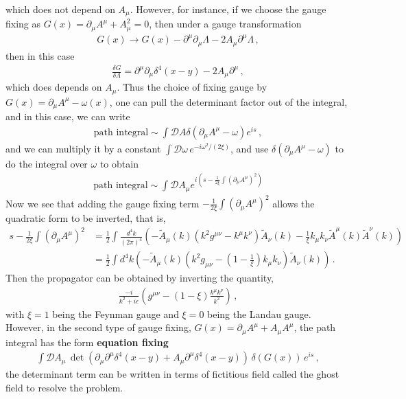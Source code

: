 \documentclass[11pt, onesided]{book}
\theoremstyle{break}
\theoremstyle{break}
\newcommand{\pd}{\partial}
\newcommand{\that}[1]{\widetilde{#1}}
\begin{document}
which does not depend on $A_\mu$. However, for instance, if we choose the gauge fixing as $G(x) = \pd_\mu A^\mu + A_\mu^2 = 0$, then under a gauge transformation
\begin{align*}
G(x) \to G(x) - \pd^\mu \pd_\mu \Lambda - 2 A_\mu \pd^\mu \Lambda\,,
\end{align*}
then in this case
\begin{align*}
\frac{\delta G}{\delta \Lambda}= \pd^\mu \pd_\mu \delta^4(x-y) - 2A_\mu \pd^\mu\,,
\end{align*}
which does depends on $A_\mu$. Thus the choice of fixing gauge by $G(x) = \pd_\mu A^\mu - \omega(x)$, one can pull the determinant factor out of the integral, and in this case, we can write
\begin{align*}
\text{path integral} \sim \int \mathcal{D}A \delta(\pd_\mu A^\mu -\omega) e^{is}\,,
\end{align*}
and we can multiply it by a constant $\int \mathcal{D}\omega \, e^{-i\omega^2 /(2\xi)}$, and use $\delta(\pd_\mu A^\mu - \omega)$ to do the integral over $\omega$ to obtain
\begin{align*}
\text{path integral} \sim \int \mathcal{D}A_\mu e^{i\left( s - \frac{1}{2\xi}\int (\pd_\mu A^\mu)^2\right)}
\end{align*}
Now we see that adding the gauge fixing term $- \frac{1}{2\xi}\int (\pd_\mu A^\mu)^2$ allows the quadratic form to be inverted, that is,
\begin{align*}
s- \frac{1}{2\xi}\int (\pd_\mu A^\mu)^2 
&= \frac{1}{2}\int \frac{d^4 k}{(2\pi)^4}
\left( -\that{A}_\mu (k) \left( k^2 g^{\mu\nu} - k^\mu k^\nu \right) \that{A}_\nu(k) - \frac{1}{\xi} k_\mu k_\nu \that{A}^\mu(k) \that{A}^\nu (k)\right)\\
&= \frac{1}{2}\int d^4k \left( - \that{A}_\mu (k) \left( k^2 g_{\mu\nu} - \left( 1- \frac{1}{\xi}\right) k_\mu k_\nu \right) \that{A}_\nu (k)\right)\,.
\end{align*}
Then the propagator can be obtained by inverting the quantity,
\begin{align*}
\frac{-i}{k^2 + i\epsilon} \left( g^{\mu\nu} - (1-\xi) \frac{k^\mu k^\nu}{k^2}\right)\,,
\end{align*}
with $\xi = 1$ being the Feynman gauge and $\xi = 0$ being the Landau gauge. \\

However, in the second type of gauge fixing, $G(x) = \pd_\mu A^\mu + A_\mu A^\mu$, the path integral has the form \textbf{equation fixing}
\begin{align*}
\int \mathcal{D}A_\mu \, \det\left( \pd_\mu \pd^\mu \delta^4(x-y) + A_\mu \pd^\mu\delta^4(x-y)\right) \, \delta(G(x)) \, e^{is}\,,
\end{align*}
the determinant term can be written in terms of fictitious field called the ghost field to resolve the problem. 
\end{document}
